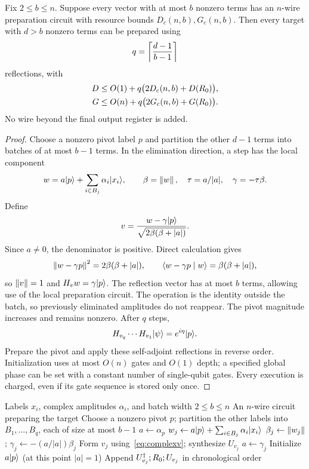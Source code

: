 \begin{lemma}\label{lem:batching}
Fix $2\le b\le n$. Suppose every vector with at most $b$ nonzero terms has an $n$-wire preparation circuit with resource bounds $D_c(n,b),G_c(n,b)$. Then every target with $d>b$ nonzero terms can be prepared using
\begin{equation}\label{eq:q}
q=\left\lceil \frac{d-1}{b-1}\right\rceil
\end{equation}
reflections, with
\begin{align}
D&\le O(1)+q\bigl(2D_c(n,b)+D(R_0)\bigr),\label{eq:batchdepth}\\
G&\le O(n)+q\bigl(2G_c(n,b)+G(R_0)\bigr).\label{eq:batchsize}
\end{align}
No wire beyond the final output register is added.
\end{lemma}
\begin{proof}
Choose a nonzero pivot label $p$ and partition the other $d-1$ terms into batches of at most $b-1$ terms. In the elimination direction, a step has the local component
\[
w=a\lvert p\rangle+\sum_{i\in B_j}\alpha_i\lvert x_i\rangle,\qquad
\beta=\left\lVert w\right\rVert,\quad\tau=a/|a|,\quad\gamma=-\tau\beta.
\]
Define
\begin{equation}\label{eq:complexv}
v=\frac{w-\gamma\lvert p\rangle}{\sqrt{2\beta(\beta+|a|)}}.
\end{equation}
Since $a\ne0$, the denominator is positive. Direct calculation gives
\[
\left\lVert w-\gamma p\right\rVert^2=2\beta(\beta+|a|),\qquad
\langle w-\gamma p\mid w\rangle=\beta(\beta+|a|),
\]
so $\left\lVert v\right\rVert=1$ and $H_vw=\gamma\lvert p\rangle$. The reflection vector has at most $b$ terms, allowing use of the local preparation circuit. The operation is the identity outside the batch, so previously eliminated amplitudes do not reappear. The pivot magnitude increases and remains nonzero. After $q$ steps,
\[
H_{v_q}\cdots H_{v_1}\lvert \psi\rangle=e^{i\eta}\lvert p\rangle.
\]
Prepare the pivot and apply these self-adjoint reflections in reverse order. Initialization uses at most $O(n)$ gates and $O(1)$ depth; a specified global phase can be set with a constant number of single-qubit gates. Every execution is charged, even if its gate sequence is stored only once.
\end{proof}

\begin{algorithm}[tb]
\caption{Batched Householder preparation with a shared pivot}\label{alg:batching}
\begin{algorithmic}[1]
\Require Labels $x_i$, complex amplitudes $\alpha_i$, and batch width $2\le b\le n$
\Ensure An $n$-wire circuit preparing the target
\State Choose a nonzero pivot $p$; partition the other labels into $B_1,\ldots,B_q$, each of size at most $b-1$
\State $a\gets\alpha_p$
\State $w_j\gets a\lvert p\rangle+\sum_{i\in B_j}\alpha_i\lvert x_i\rangle$
\State $\beta_j\gets\left\lVert w_j\right\rVert$; $\gamma_j\gets-(a/|a|)\beta_j$
\State Form $v_j$ using~\eqref{eq:complexv}; synthesize $U_{v_j}$
\State $a\gets\gamma_j$
\EndFor
\State Initialize $a\lvert p\rangle$ (at this point $|a|=1$)
\State Append $U_{v_j}^{\dagger};R_0;U_{v_j}$ in chronological order
\EndFor
\end{algorithmic}
\end{algorithm}

